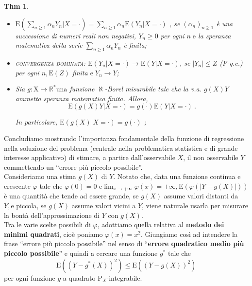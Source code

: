 \documentclass[a4paper,11pt]{article}
\theoremstyle{plain}
\newtheorem{thm}{Thm}[section]
\theoremstyle{definition}
\theoremstyle{remark}
\begin{document}
\begin{thm}
\begin{itemize}
\item $ \displaystyle \mathrm{E}(\sum_{n\geq 1}\alpha_{n}Y_{n}|X=\cdot)=\sum_{n\geq 1}\alpha_{n}\mathrm{E}(Y_{n}|X=\cdot)$ , se $(\alpha_{n})_{n\geq 1}$ \`{e} una successione di numeri reali non negativi, $Y_{n}\geq 0$ per ogni $n\mathrm{\; e}$ la speranza matematica della serie $\displaystyle \sum_{n\geq 1}\alpha_{n}Y_{n}$ \`{e} finita;

\item \textsc{convergenza dominata}: $\mathrm{E}(Y_{n}|X=\cdot)\rightarrow \mathrm{E}(Y|X=\cdot)$, se $|Y_{n}|\leq Z$ (P-q.c.) per ogni $n, \mathrm{E}(Z)$ finita $\mathrm{e \;}Y_{n}\rightarrow Y$;

\item Sia $g:\mathrm{X}\mapsto \mathbb{R}^{*}\mathrm{u}\mathrm{n}\mathrm{a}$ funzione $\aleph$-Borel misurabile tale che la v.a. $g(X)Y$ ammetta speranza matematica finita. Allora,
$$
\mathrm{E}(g(X)Y|X=\cdot)=g(\cdot) \mathrm{E}(Y|X=\cdot)\ .
$$  

In particolare, $\mathrm{E}(g(X)|X=\cdot)=g(\cdot)$ ;
\end{itemize}
\end{thm}

\noindent
Concludiamo mostrando l'importanza fondamentale della funzione di regressione nella soluzione del problema (centrale nella problematica statistica $\mathrm{e}$ di grande interesse applicativo) di stimare, a partire dall'osservabile $X$, il non osservabile $Y$ commettendo un ``errore pi\`{u} piccolo possibile''.\\

\noindent
Consideriamo una stima $g(X)$ di $Y$. Notato $\mathrm{c}\mathrm{h}\mathrm{e}$, data una funzione continua $\mathrm{e}$ crescente $\varphi$ tale che $\displaystyle \varphi(0)=0$ $\mathrm{e}\lim_{x\rightarrow+\infty}\varphi(x)=+\infty, \mathrm{E}(\varphi(|Y-g(X)|))$ \`{e} una quantit\`{a} che tende ad essere grande, se $g(X)$ assume valori distanti da $Y, \mathrm{e}$ piccola, se $g(X)$ assume valori vicini a $Y$, viene naturale usarla per misurare la bont\`{a} dell'approssimazione di $Y$ con $g(X)$.\\

\noindent
Tra le varie scelte possibili di $\varphi$, adottiamo quella relativa al \textbf{metodo dei minimi quadrati}, cio\`{e} poniamo $\varphi(x)=x^{2}$. Giungiamo così ad intendere la frase ``errore pi\`{u} piccolo possibile'' nel senso di ``\textbf{errore quadratico medio pi\`{u} piccolo possibile}'' $\mathrm{e}$ quindi a cercare una funzione $g^{*}$ tale che
$$
\mathrm{E}((Y-g^{*}(X))^{2})\leq \mathrm{E}((Y-g(X))^{2})
$$
per ogni funzione $g$ a quadrato $\mathrm{P}_{X}$-integrabile.\\
\end{document}

